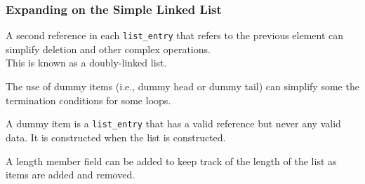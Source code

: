 

\begin{frame}
\frametitle{Expanding on the Simple Linked List}

A second reference in each \texttt{list\_entry} that refers to the previous element can simplify deletion and other complex operations.\\
\quad This is known as a doubly-linked list.

The use of dummy items (i.e., dummy head or dummy tail) can simplify some the termination conditions for some loops.

A dummy item is a \texttt{list\_entry} that has a valid reference but never any valid data. It is constructed when the list is constructed.

A length member field can be added to keep track of the length of the list as items are added and removed.

\end{frame}



